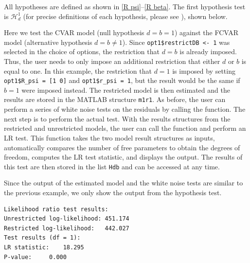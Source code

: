 \documentclass[article]{jss}
\newcommand{\fct}[1]{\code{#1()}}
\begin{document}
All hypotheses are defined as shown in \eqref{R psi}--\eqref{R beta}. The first hypothesis test is $\mathscr{H}_d^1$ (for precise definitions of each hypothesis, please see \cite{JNP2014}), 
shown below. 


Here we test the CVAR model (null hypothesis $d=b=1$) against the FCVAR model (alternative hypothesis $d=b$). Since \verb|opt1$restrictDB <- 1| was selected in the choice of options,
the restriction that $d=b$ is already imposed. Thus, the user needs to only impose an additional restriction that either $d$ or $b$ is equal to one. In this example, the restriction that $d=1$ is imposed by setting \verb|opt1$R_psi = [1 0]| and \verb|opt1$r_psi = 1|, but the result would be the same if $b=1$ were imposed instead. The restricted model is then estimated and the results are stored in the MATLAB structure \verb|m1r1|. As before, the user can perform a series of white noise tests on the residuals by calling the \fct{MVWNtest} function. The next step is to perform the actual test. With the results structures from the restricted and unrestricted models, the user can call the function \fct{FCVARhypoTest} and perform an LR test. This function takes the two model result structures as inputs, automatically compares the number of free parameters to obtain the degrees of freedom, computes the LR test statistic, and displays the output. The results of this test are then stored in the list \verb|Hdb| and can be accessed at any time.

Since the output of the estimated model and the white noise tests are similar to the previous example, we only show the output from the hypothesis test. 

\begin{verbatim}
Likelihood ratio test results:
Unrestricted log-likelihood: 451.174
Restricted log-likelihood:   442.027
Test results (df = 1):
LR statistic: 	 18.295
P-value: 	 0.000
\end{verbatim}
\end{document}
